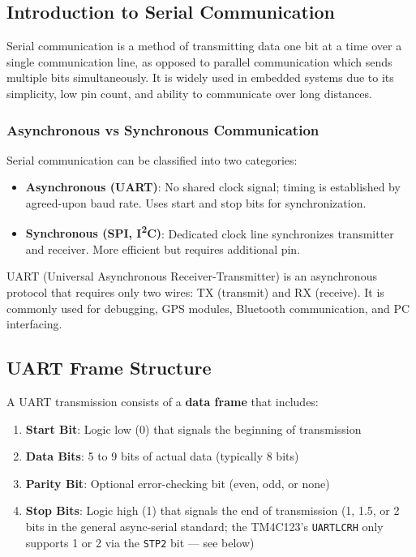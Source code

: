 \subsection{Introduction to Serial Communication}

Serial communication is a method of transmitting data one bit at a time over a single communication line, as opposed to parallel communication which sends multiple bits simultaneously. It is widely used in embedded systems due to its simplicity, low pin count, and ability to communicate over long distances.

\subsubsection{Asynchronous vs Synchronous Communication}

Serial communication can be classified into two categories:

\begin{itemize}[nosep]
  \item \textbf{Asynchronous (UART)}: No shared clock signal; timing is established by agreed-upon baud rate. Uses start and stop bits for synchronization.
  \item \textbf{Synchronous (SPI, I\textsuperscript{2}C)}: Dedicated clock line synchronizes transmitter and receiver. More efficient but requires additional pin.
\end{itemize}

UART (Universal Asynchronous Receiver-Transmitter) is an asynchronous protocol that requires only two wires: TX (transmit) and RX (receive). It is commonly used for debugging, GPS modules, Bluetooth communication, and PC interfacing.

\subsection{UART Frame Structure}

A UART transmission consists of a \textbf{data frame} that includes:

\begin{enumerate}[nosep]
  \item \textbf{Start Bit}: Logic low (0) that signals the beginning of transmission
  \item \textbf{Data Bits}: 5 to 9 bits of actual data (typically 8 bits)
  \item \textbf{Parity Bit}: Optional error-checking bit (even, odd, or none)
  \item \textbf{Stop Bits}: Logic high (1) that signals the end of transmission (1, 1.5, or 2 bits in the general async-serial standard; the TM4C123's \texttt{UARTLCRH} only supports 1 or 2 via the \texttt{STP2} bit — see below)
\end{enumerate}

